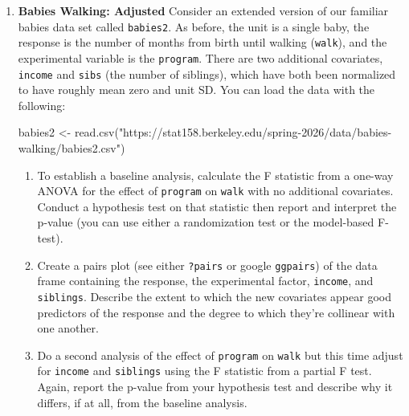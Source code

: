 \documentclass[
  letterpaper,
  DIV=11,
  numbers=noendperiod]{scrartcl}
\newenvironment{Shaded}{\begin{snugshade}}{\end{snugshade}}
\newcommand{\FunctionTok}[1]{\textcolor[rgb]{0.28,0.35,0.67}{#1}}
\newcommand{\NormalTok}[1]{\textcolor[rgb]{0.00,0.23,0.31}{#1}}
\newcommand{\OtherTok}[1]{\textcolor[rgb]{0.00,0.23,0.31}{#1}}
\newcommand{\StringTok}[1]{\textcolor[rgb]{0.13,0.47,0.30}{#1}}
\begin{document}
\newpage{}

\begin{enumerate}
\def\labelenumi{\arabic{enumi}.}
\setcounter{enumi}{2}
\item
  \textbf{Babies Walking: Adjusted} Consider an extended version of our
  familiar babies data set called \texttt{babies2}. As before, the unit
  is a single baby, the response is the number of months from birth
  until walking (\texttt{walk}), and the experimental variable is the
  \texttt{program}. There are two additional covariates, \texttt{income}
  and \texttt{sibs} (the number of siblings), which have both been
  normalized to have roughly mean zero and unit SD. You can load the
  data with the following:

\begin{Shaded}
\begin{Highlighting}[]
\NormalTok{babies2 }\OtherTok{\textless{}{-}} \FunctionTok{read.csv}\NormalTok{(}\StringTok{"https://stat158.berkeley.edu/spring{-}2026/data/babies{-}walking/babies2.csv"}\NormalTok{)}
\end{Highlighting}
\end{Shaded}

  \begin{enumerate}
  \def\labelenumii{\alph{enumii}.}
  \item
    To establish a baseline analysis, calculate the F statistic from a
    one-way ANOVA for the effect of \texttt{program} on \texttt{walk}
    with no additional covariates. Conduct a hypothesis test on that
    statistic then report and interpret the p-value (you can use either
    a randomization test or the model-based F-test).
  \item
    Create a pairs plot (see either \texttt{?pairs} or google
    \texttt{ggpairs}) of the data frame containing the response, the
    experimental factor, \texttt{income}, and \texttt{siblings}.
    Describe the extent to which the new covariates appear good
    predictors of the response and the degree to which they're collinear
    with one another.
  \item
    Do a second analysis of the effect of \texttt{program} on
    \texttt{walk} but this time adjust for \texttt{income} and
    \texttt{siblings} using the F statistic from a partial F test.
    Again, report the p-value from your hypothesis test and describe why
    it differs, if at all, from the baseline analysis.
  \end{enumerate}
\end{enumerate}
\end{document}
